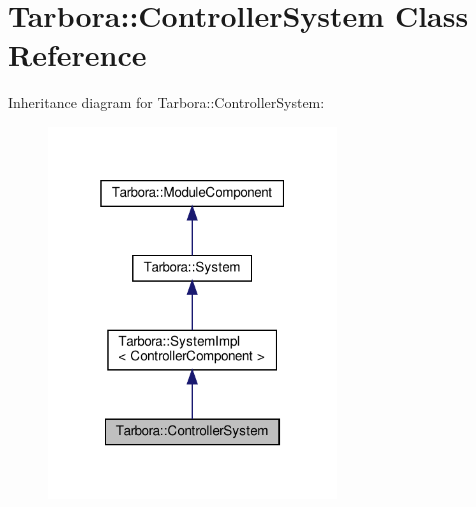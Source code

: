 \hypertarget{classTarbora_1_1ControllerSystem}{}\section{Tarbora\+:\+:Controller\+System Class Reference}
\label{classTarbora_1_1ControllerSystem}


Inheritance diagram for Tarbora\+:\+:Controller\+System\+:
\nopagebreak
\begin{figure}[H]
\begin{center}
\leavevmode
\includegraphics[width=217pt]{classTarbora_1_1ControllerSystem__inherit__graph}
\end{center}
\end{figure}


